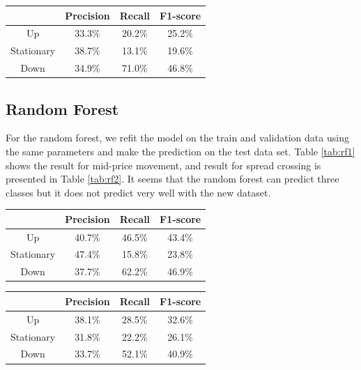\documentclass[11pt]{article}
\begin{document}
\begin{center}
   \label{tab:svm2} 
  \begin{tabular}{|c | c | c | c|} 
    \hline
    & Precision & Recall & F1-score \\
    \hline
    Up & 33.3\% & 20.2\%  & 25.2\% \\ 
    \hline
    Stationary & 38.7\% & 13.1\% & 19.6\% \\
    \hline
    Down & 34.9\% & 71.0\% & 46.8\%  \\
    \hline
  \end{tabular}
\end{center}

\subsection{Random Forest}
For the random forest, we refit the model on the train and validation data using the same parameters and make the prediction on the test data set. Table \ref{tab:rf1} shows the result for mid-price movement, and result for spread crossing is presented in Table \ref{tab:rf2}. It seems that the random forest can predict three classes but it does not predict very well with the new dataset.

\begin{center}
   \label{tab:rf1} 
  \begin{tabular}{|c | c | c | c|} 
    \hline
     & Precision & Recall & F1-score \\
    \hline
    Up & 40.7\%  & 46.5\% & 43.4\% \\ 
    \hline
    Stationary & 47.4\% & 15.8\% & 23.8\% \\
    \hline
    Down &  37.7\% & 62.2\%  & 46.9\%  \\
    \hline
  \end{tabular}
\end{center}

\begin{center}
   \label{tab:rf2} 
  \begin{tabular}{|c | c | c | c|} 
    \hline
     & Precision & Recall & F1-score  \\
    \hline
    Up &  38.1\% & 28.5\% & 32.6\% \\ 
    \hline
    Stationary & 31.8\% & 22.2\% & 26.1\% \\
    \hline
    Down & 33.7\% & 52.1\% & 40.9\% \\
    \hline
  \end{tabular}
\end{center}
\end{document}
